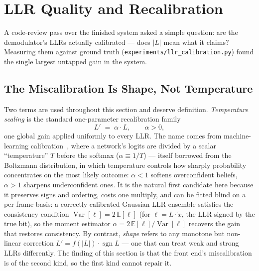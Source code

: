 \section{LLR Quality and Recalibration}
\label{sec:llr}

A code-review pass over the finished system asked a simple question:
are the demodulator's LLRs actually calibrated --- does $|L|$ mean
what it claims?  Measuring them against ground truth
(\texttt{experiments/llr\_calibration.py}) found the single largest
untapped gain in the system.

\subsection{The Miscalibration Is Shape, Not Temperature}

Two terms are used throughout this section and deserve definition.
\emph{Temperature scaling} is the standard one-parameter recalibration
family
\begin{equation}
    L' \;=\; \alpha \cdot L, \qquad \alpha > 0,
\end{equation}
one global gain applied uniformly to every LLR.  The name comes from
machine-learning calibration~\cite{guo2017calibration}, where a
network's logits are divided by a scalar ``temperature'' $T$ before
the softmax ($\alpha \equiv 1/T$) --- itself borrowed from the
Boltzmann distribution, in which temperature controls how sharply
probability concentrates on the most likely outcome: $\alpha < 1$
softens overconfident beliefs, $\alpha > 1$ sharpens underconfident
ones.  It is the natural first candidate here because it preserves
signs and ordering, costs one multiply, and can be fitted blind on a
per-frame basis: a correctly calibrated Gaussian LLR ensemble
satisfies the consistency condition
$\operatorname{Var}[\ell] = 2\,\mathbb{E}[\ell]$ (for
$\ell = L \cdot \tilde{x}$, the LLR signed by the true bit), so the
moment estimator $\alpha = 2\,\mathbb{E}[\ell]/\operatorname{Var}[\ell]$
recovers the gain that restores consistency.  By contrast,
\emph{shape} refers to any monotone but non-linear correction
$L' = f(|L|) \cdot \operatorname{sgn} L$ --- one that can treat weak
and strong LLRs differently.  The finding of this section is that the
front end's miscalibration is of the second kind, so the first kind
cannot repair it.

